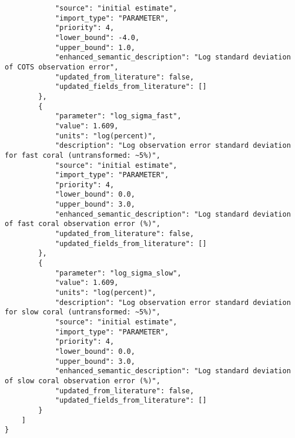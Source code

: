 \begin{lstlisting}
            "source": "initial estimate",
            "import_type": "PARAMETER",
            "priority": 4,
            "lower_bound": -4.0,
            "upper_bound": 1.0,
            "enhanced_semantic_description": "Log standard deviation of COTS observation error",
            "updated_from_literature": false,
            "updated_fields_from_literature": []
        },
        {
            "parameter": "log_sigma_fast",
            "value": 1.609,
            "units": "log(percent)",
            "description": "Log observation error standard deviation for fast coral (untransformed: ~5%)",
            "source": "initial estimate",
            "import_type": "PARAMETER",
            "priority": 4,
            "lower_bound": 0.0,
            "upper_bound": 3.0,
            "enhanced_semantic_description": "Log standard deviation of fast coral observation error (%)",
            "updated_from_literature": false,
            "updated_fields_from_literature": []
        },
        {
            "parameter": "log_sigma_slow",
            "value": 1.609,
            "units": "log(percent)",
            "description": "Log observation error standard deviation for slow coral (untransformed: ~5%)",
            "source": "initial estimate",
            "import_type": "PARAMETER",
            "priority": 4,
            "lower_bound": 0.0,
            "upper_bound": 3.0,
            "enhanced_semantic_description": "Log standard deviation of slow coral observation error (%)",
            "updated_from_literature": false,
            "updated_fields_from_literature": []
        }
    ]
}
\end{lstlisting}
